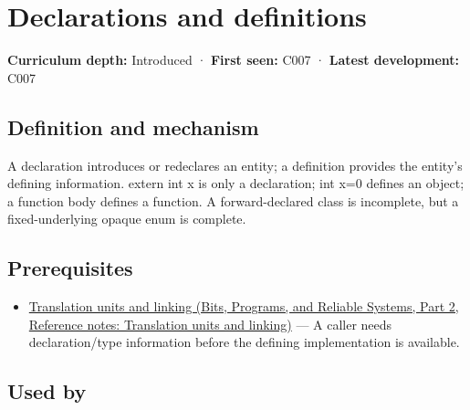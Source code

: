 \hypertarget{appendix-2e4d494c2d94}{}\label{referencestart:appendix-2e4d494c2d94}
\section{Declarations and definitions}\label{appendix-2e4d494c2d94-declarations-and-definitions}

\hypertarget{appendix-2e4d494c2d94-declarations-and-definitions}{}

\textbf{Curriculum depth:} Introduced · \textbf{First seen:} C007 · \textbf{Latest development:} C007

\begin{allmightroledefinition}

\subsection{Definition and mechanism}\label{appendix-2e4d494c2d94-definition-and-mechanism}

\hypertarget{appendix-2e4d494c2d94-definition-and-mechanism}{}

A declaration introduces or redeclares an entity; a definition provides the entity's defining information. extern int x is only a declaration; int x=0 defines an object; a function body defines a function. A forward-declared class is incomplete, but a fixed-underlying opaque enum is complete.

\end{allmightroledefinition}

\subsection{Prerequisites}\label{appendix-2e4d494c2d94-prerequisites}

\hypertarget{appendix-2e4d494c2d94-prerequisites}{}

\begin{itemize}
\tightlist
\item
  \href{../01-Bits-Programs-and-Reliable-Systems-P02/main.pdf\#appendix-806686359e1b}{Translation units and linking (Bits, Programs, and Reliable Systems, Part 2, Reference notes: Translation units and linking)} --- A caller needs declaration/type information before the defining implementation is available.
\end{itemize}

\subsection{Used by}\label{appendix-2e4d494c2d94-used-by}

